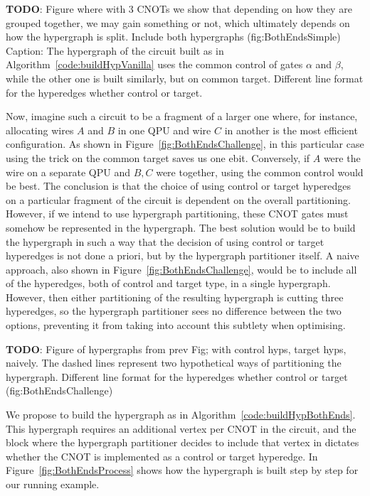 \textbf{TODO}: Figure where with 3 CNOTs we show that depending on how they are grouped together, we may gain something or not, which ultimately depends on how the hypergraph is split. Include both hypergraphs (fig:BothEndsSimple) Caption: The hypergraph of the circuit built as in Algorithm~\ref{code:buildHypVanilla} uses the common control of gates \(\alpha\) and \(\beta\), while the other one is built similarly, but on common target. Different line format for the hyperedges whether control or target.

Now, imagine such a circuit to be a fragment of a larger one where, for instance, allocating wires \(A\) and \(B\) in one QPU and wire \(C\) in another is the most efficient configuration. As shown in Figure~\ref{fig:BothEndsChallenge}, in this particular case using the trick on the common target saves us one ebit. Conversely, if \(A\) were the wire on a separate QPU and \(B,C\) were together, using the common control would be best. The conclusion is that the choice of using control or target hyperedges on a particular fragment of the circuit is dependent on the overall partitioning. However, if we intend to use hypergraph partitioning, these CNOT gates must somehow be represented in the hypergraph. The best solution would be to build the hypergraph in such a way that the decision of using control or target hyperedges is not done a priori, but by the hypergraph partitioner itself. A naive approach, also shown in Figure~\ref{fig:BothEndsChallenge}, would be to include all of the hyperedges, both of control and target type, in a single hypergraph. However, then either partitioning of the resulting hypergraph is cutting three hyperedges, so the hypergraph partitioner sees no difference between the two options, preventing it from taking into account this subtlety when optimising.

\textbf{TODO}: Figure of hypergraphs from prev Fig; with control hyps, target hyps, naively. The dashed lines represent two hypothetical ways of partitioning the hypergraph. Different line format for the hyperedges whether control or target (fig:BothEndsChallenge)

We propose to build the hypergraph as in Algorithm~\ref{code:buildHypBothEnds}. This hypergraph requires an additional vertex per CNOT in the circuit, and the block where the hypergraph partitioner decides to include that vertex in dictates whether the CNOT is implemented as a control or target hyperedge. In Figure~\ref{fig:BothEndsProcess} shows how the hypergraph is built step by step for our running example. 

